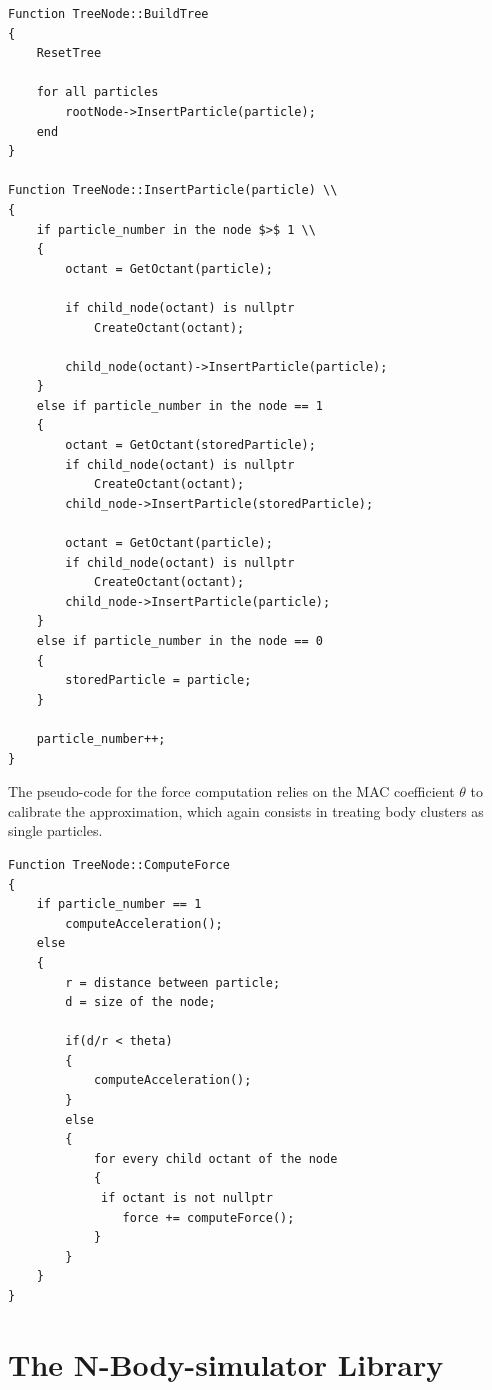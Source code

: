 \documentclass{article}
\begin{document}
\begin{boxA}
\begin{verbatim}
Function TreeNode::BuildTree
{
    ResetTree

    for all particles
        rootNode->InsertParticle(particle);
    end
}

Function TreeNode::InsertParticle(particle) \\
{
    if particle_number in the node $>$ 1 \\
    {
        octant = GetOctant(particle);

        if child_node(octant) is nullptr
            CreateOctant(octant);

        child_node(octant)->InsertParticle(particle);
    }
    else if particle_number in the node == 1
    {
        octant = GetOctant(storedParticle);
        if child_node(octant) is nullptr 
            CreateOctant(octant);
        child_node->InsertParticle(storedParticle);
        
        octant = GetOctant(particle);
        if child_node(octant) is nullptr 
            CreateOctant(octant);
        child_node->InsertParticle(particle);
    }
    else if particle_number in the node == 0
    {
        storedParticle = particle;
    }
    
    particle_number++;
}
\end{verbatim}
\end{boxA} 

\newpage
The pseudo-code for the force computation relies on the MAC coefficient $\theta$ to calibrate the approximation, which again consists in treating body clusters as single particles.
\begin{boxA}
\begin{verbatim}
Function TreeNode::ComputeForce
{
    if particle_number == 1
        computeAcceleration();
    else 
    {
        r = distance between particle; 
        d = size of the node;

        if(d/r < theta)
        {
            computeAcceleration();
        }
        else 
        {
            for every child octant of the node
            {
             if octant is not nullptr
                force += computeForce();
            }
        }    
    }
}
\end{verbatim}
\end{boxA}

\section{The N-Body-simulator Library}
\end{document}
